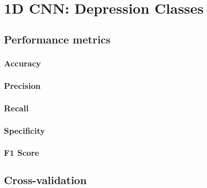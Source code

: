 \section{1D CNN: Depression Classes}
\subsection{Performance metrics}
\subsubsection{Accuracy}
\subsubsection{Precision}
\subsubsection{Recall}
\subsubsection{Specificity}
\subsubsection{F1 Score}

\subsection{Cross-validation}

